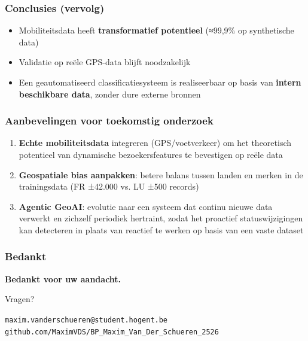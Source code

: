 \documentclass[aspectratio=169]{beamer}
\begin{document}
    \begin{frame}
        \frametitle{Conclusies (vervolg)}
        
        \begin{itemize}
            \item Mobiliteitsdata heeft \textbf{transformatief potentieel} (≈99,9\% op synthetische data)
            \item Validatie op reële GPS-data blijft noodzakelijk
            \item Een geautomatiseerd classificatiesysteem is realiseerbaar op basis van \textbf{intern beschikbare data}, zonder dure externe bronnen
        \end{itemize}
        
        \end{frame}
    
    \begin{frame}
        \frametitle{Aanbevelingen voor toekomstig onderzoek}
        
        \begin{enumerate}
            \item \textbf{Echte mobiliteitsdata} integreren (GPS/voetverkeer) om het theoretisch potentieel van dynamische bezoekersfeatures te bevestigen op reële data
            \item \textbf{Geospatiale bias aanpakken}: betere balans tussen landen en merken in de trainingsdata (FR ±42.000 vs. LU ±500 records)
            \item \textbf{Agentic GeoAI}: evolutie naar een systeem dat continu nieuwe data verwerkt en zichzelf periodiek hertraint, zodat het proactief statuswijzigingen kan detecteren in plaats van reactief te werken op basis van een vaste dataset
        \end{enumerate}
        
    \end{frame}
    
    \begin{frame}
        \frametitle{Bedankt}
        
        \begin{center}
            {\Large \textbf{Bedankt voor uw aandacht.}}
            
            \vspace{1em}
            
            {\large Vragen?}
            
            \vspace{2em}
            
            \texttt{maxim.vanderschueren@student.hogent.be} \\[0.3em]
            \texttt{github.com/MaximVDS/BP\_Maxim\_Van\_Der\_Schueren\_2526}
        \end{center}
        
    \end{frame}
    
\end{document}
